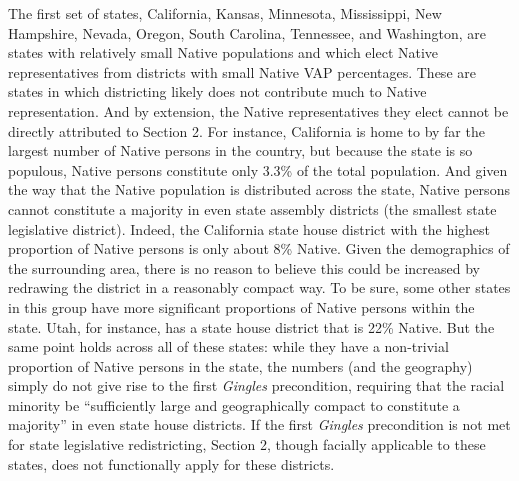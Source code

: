 \documentclass[12pt]{article}
\begin{document}
The first set of states, California, Kansas, Minnesota, Mississippi, New Hampshire, Nevada, Oregon, South Carolina, Tennessee, and Washington, are states with relatively small Native populations and which elect Native representatives from districts with small Native VAP percentages.  These are states in which districting likely does not contribute much to Native representation. And by extension, the Native representatives they elect cannot be directly attributed to Section 2. For instance, California is home to by far the largest number of Native persons in the country, but because the state is so populous, Native persons constitute only 3.3\% of the total population. And given the way that the Native population is distributed across the state, Native persons cannot constitute a majority in even state assembly districts (the smallest state legislative district). Indeed, the California state house district with the highest proportion of Native persons is only about 8\% Native. Given the demographics of the surrounding area, there is no reason to believe this could be increased by redrawing the district in a reasonably compact way. To be sure, some other states in this group have more significant proportions of Native persons within the state. Utah, for instance, has a state house district that is 22\% Native. But the same point holds across all of these states: while they have a non-trivial proportion of Native persons in the state, the numbers (and the geography) simply do not give rise to the first \textit{Gingles} precondition, requiring that the racial minority be ``sufficiently large and geographically compact to constitute a majority'' in even state house districts. If the first \textit{Gingles} precondition is not met for state legislative redistricting, Section 2, though facially applicable to these states, does not functionally apply for these districts.
\end{document}
